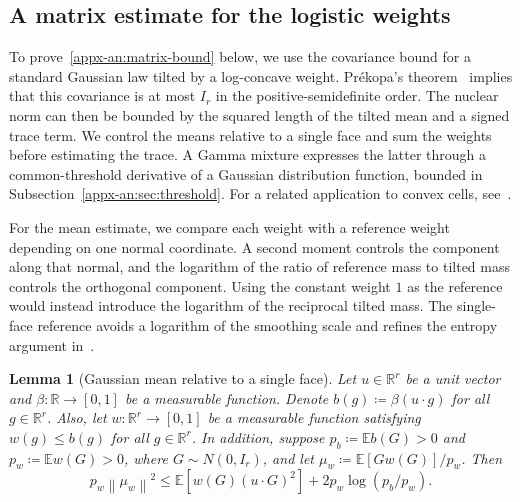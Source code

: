 \documentclass[11pt,letterpaper]{article}
\newtheorem{lemma}{Lemma}
\theoremstyle{remark}
\newcommand{\E}{\mathbb E}
\newcommand{\R}{\mathbb R}
\newcommand{\norm}[1]{\left\lVert#1\right\rVert}
\begin{document}
\subsection{A matrix estimate for the logistic weights}
\label{appx-an:sec:matrix}

{To prove~\eqref{appx-an:matrix-bound} below, we use the covariance bound for}
a standard Gaussian law tilted by a log-concave weight. Pr\'ekopa's
theorem~\cite[Theorem~6]{Prekopa1973} implies that this covariance is
at most \(I_r\) in the positive-semidefinite order. The nuclear norm
can then be bounded by the squared length of the tilted mean and a
signed trace term. We control the means relative to a single face and sum the
weights before estimating the trace. A Gamma mixture expresses the
latter through a common-threshold derivative of a Gaussian distribution
function, bounded in Subsection~\ref{appx-an:sec:threshold}.
For a related application to convex cells,
see~\cite[Lemma~12]{GaoZhang}.

For the mean estimate, we compare each weight with a reference weight
depending on one normal coordinate. A second moment controls the
component along that normal, and the logarithm of the ratio of
reference mass to tilted mass controls the orthogonal component.
Using the constant weight \(1\) as the reference would instead introduce
the logarithm of the reciprocal tilted mass. The single-face reference
avoids a logarithm of the smoothing scale and refines the entropy argument
in~\cite[Lemma~12]{GaoZhang}.

\begin{lemma}[Gaussian mean relative to a single face]
\label{appx-an:lem:mean}
Let \(u\in\R^r\) be a unit vector and
\(\beta:\R\to[0,1]\) be a measurable function. Denote
\(b(g)\coloneqq\beta(u\cdot g)\) for all \(g\in\R^r\).
Also, let \(w:\R^r\to[0,1]\) be a measurable function
satisfying \(w(g)\le b(g)\) for all $g\in\R^r$.
In addition, suppose \(p_b\coloneqq\E b(G)>0\) and
\(p_w\coloneqq\E w(G)>0\), where \(G\sim N(0,I_r)\),
and let \(\mu_w\coloneqq\E[Gw(G)]/p_w\). Then
\begin{equation}
 p_w\norm{\mu_w}^2
 \le \E[w(G)(u\cdot G)^2]
        +2p_w\log(p_b/p_w).
 \label{appx-an:mean-entropy}
\end{equation}
\end{lemma}
\end{document}
